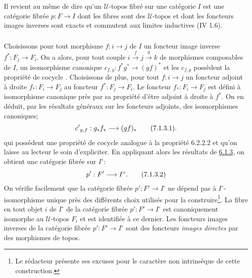 \documentclass[10pt]{../fichiers-configuration-latex/smfart}
\begin{document}
\subsubsection{}

Il revient au même de dire qu'un $𝒰$-topos fibré sur une
catégorie $I$ est une catégorie fibrée $p : F \to I$ dont les fibres
sont des $𝒰$-topos et dont les foncteurs\pageoriginale
images inverses sont exacts et commutent aux limites inductives (IV
1.6).


\subsubsection{}

Choisissons pour tout morphisme $f : i \to j$ de $I$ un foncteur
image inverse $f^{\ast} : F_j \to F_i$. On a alors, pour tout couple
$i \xrightarrow{f} j \xrightarrow{g} k$ de morphismes composables de
$I$, un isomorphisme canonique $c_{f, g} : f^{\ast} g^{\ast} \to
(gf)^{\ast}$   et les $c_{f, g}$ possèdent la
propriété de cocycle . Choisissons de plus, pour tout
$f : i \to j$ un foncteur adjoint à droite $f_{\ast} : F_{i} \to
F_j$ au foncteur $f^{\ast} : F_j \to F_i$. Le foncteur $f_{\ast} :
F_i \to F_j$ est défini à isomorphisme canonique près par sa
propriété d'être adjoint à droite à $f^{\ast}$. On en déduit, par
les résultats généraux sur les foncteurs adjoints, des isomorphismes
canoniques;
\begin{equation*}
{c'}_{g, f} : g_{\ast} f_{\ast} \to (gf)_{\ast}\tag{7.1.3.1}{\quoi}.
\end{equation*}
qui possèdent une propriété de cocycle analogue à la propriété
6.2.2.2
et qu'on laisse au lecteur le soin d'expliciter. En appliquant alors
les résultats de \hyperref[VI.subsubsec6.1.3]{6.1.3}, on obtient une catégorie fibrée sur
$I^{\circ}$:
\begin{equation*}
p': F'\to I^{\circ}{\quoi}.\tag{7.1.3.2}
\end{equation*}
On vérifie facilement que la catégorie fibrée $p': F'\to I^{\circ}$ ne
dépend pas à $I^{\circ}$-isomorphisme unique près des différents choix
utilisés pour la construire\footnote{Le rédacteur présente ses excuses
  pour le caractère non intrinsèque de cette construction.}. La fibre
en tout objet $i$ de $I^{\circ}$ de la catégorie fibrée $p': F'\to
I^{\circ}$ est canoniquement isomorphe au $𝒰$-topos $F_i$ et est
identifiée à ce dernier. Les foncteurs images inverses de la
catégorie fibrée $p': F'\to I^{\circ}$ sont des foncteurs
\emph{images directes} par des morphismes de topos.
\end{document}
